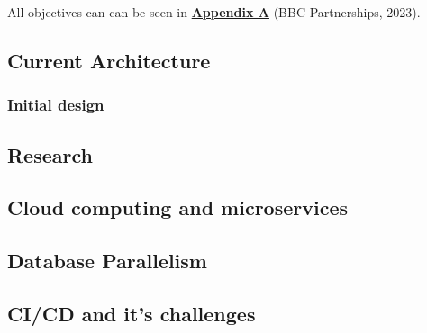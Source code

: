   All objectives can can be seen in \hyperref[sec:AppendixA]{\textbf{Appendix A}} (BBC Partnerships, 2023).

  \subsection{Current Architecture}
    \subsubsection{Initial design}

  \subsection{Research}
    \subsection{Cloud computing and microservices}
    \subsection{Database Parallelism}
    \subsection{CI/CD and it's challenges}

\newpage
